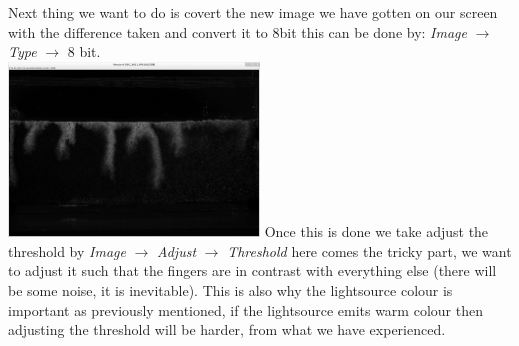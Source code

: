 \documentclass[twoside]{article}
\begin{document}
\begin{multicols}{2}
Next thing we want to do is covert the new image we have gotten on our screen with the difference taken and convert it to $8$bit this can be done by: \textit{Image} $\longrightarrow$ \textit{Type} $\longrightarrow$ $8$ bit. \\

\includegraphics[width=0.5\textwidth]{bit.png}\label{fig:bit}
\vspace{0.3cm}
Once this is done we take adjust the threshold by \textit{Image} $\longrightarrow$ \textit{Adjust} $\longrightarrow$ \textit{Threshold} here comes the tricky part, we want to adjust it such that the fingers are in contrast with everything else (there will be some noise, it is inevitable). This is also why the lightsource colour is important as previously mentioned, if the lightsource emits warm colour then adjusting the threshold will be harder, from what we have experienced.\\ 


\end{multicols}
\end{document}
